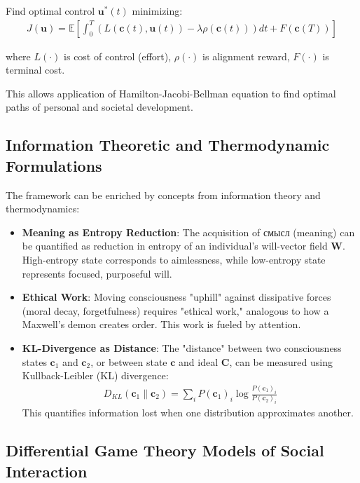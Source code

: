 \documentclass[11pt,a4paper]{article}
\theoremstyle{definition}
\theoremstyle{remark}
\newcommand{\WW}{\mathbf{W}}
\newcommand{\cc}{\mathbf{c}}
\begin{document}
Find optimal control \(\mathbf{u}^*(t)\) minimizing:
\begin{align}
    J(\mathbf{u}) = \mathbb{E} \left[ \int_0^T \left( L(\cc(t), \mathbf{u}(t)) - \lambda \rho(\cc(t)) \right) dt + F(\cc(T)) \right]
\end{align}

where \(L(\cdot)\) is cost of control (effort), \(\rho(\cdot)\) is alignment reward, \(F(\cdot)\) is terminal cost.

This allows application of Hamilton-Jacobi-Bellman equation to find optimal paths of personal and societal development.

\subsection{Information Theoretic and Thermodynamic Formulations}

The framework can be enriched by concepts from information theory and thermodynamics:

\begin{itemize}
    \item \textbf{Meaning as Entropy Reduction}: The acquisition of смысл (meaning) can be quantified as reduction in entropy of an individual's will-vector field \(\WW\). High-entropy state corresponds to aimlessness, while low-entropy state represents focused, purposeful will.
    
    \item \textbf{Ethical Work}: Moving consciousness "uphill" against dissipative forces (moral decay, forgetfulness) requires "ethical work," analogous to how a Maxwell's demon creates order. This work is fueled by attention.
    
    \item \textbf{KL-Divergence as Distance}: The "distance" between two consciousness states \(\cc_1\) and \(\cc_2\), or between state \(\cc\) and ideal \(\mathbf{C}\), can be measured using Kullback-Leibler (KL) divergence:
    \begin{align}
    D_{KL}(\cc_1 \| \cc_2) = \sum_i P(\cc_1)_i \log \frac{P(\cc_1)_i}{P(\cc_2)_i}
    \end{align}
    This quantifies information lost when one distribution approximates another.
\end{itemize}

\subsection{Differential Game Theory Models of Social Interaction}
\end{document}
